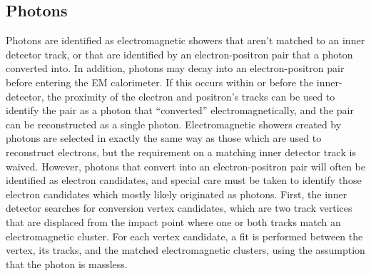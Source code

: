 \subsection{Photons}
Photons are identified as electromagnetic showers that aren't matched to an inner detector track,
or that are identified by an electron-positron pair that a photon converted into.
In addition, photons may decay into an electron-positron pair before entering the EM calorimeter.
If this occurs within or before the inner-detector, the proximity of the electron and positron's tracks can be used to identify the pair as a photon that ``converted'' electromagnetically, and the pair can be reconstructed as a single photon.
Electromagnetic showers created by photons are selected in exactly the same way as those which are used to reconstruct electrons, but the requirement on a matching inner detector track is waived.  
However, photons that convert into an electron-positron pair will often be identified as electron candidates, and special care must be taken to identify those electron candidates which mostly likely originated as photons.
First, the inner detector searches for conversion vertex candidates, which are two track vertices that are displaced from the impact point where one or both tracks match an electromagnetic cluster.
For each vertex candidate, a fit is performed between the vertex, its tracks, and the matched electromagnetic clusters, using the assumption that the photon is massless.





